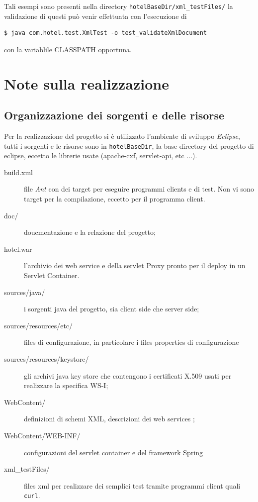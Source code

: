 \documentclass[a4paper]{article}
\begin{document}
Tali esempi sono presenti nella directory
\verb'hotelBaseDir/xml_testFiles/' la validazione di questi pu\`o venir
effettuata con l'esecuzione di
\begin{verbatim}
$ java com.hotel.test.XmlTest -o test_validateXmlDocument
\end{verbatim}
con la variablile CLASSPATH opportuna.


\section{Note sulla realizzazione}
\subsection{Organizzazione dei sorgenti e delle risorse}
\label{sec:realizzazione.organizzazione}
Per la realizzazione del progetto si \`e utilizzato l'ambiente di
sviluppo \emph{Eclipse}, tutti i sorgenti e le risorse sono in
\verb+hotelBaseDir+, la base directory del progetto di eclipse, eccetto
le librerie usate (apache-cxf, servlet-api, etc ...).
\begin{description}
\item [build.xml] file \emph{Ant} con dei target per eseguire
  programmi clients e di test. Non vi sono target per la compilazione,
  eccetto per il programma client.
\item [doc/] doucmentazione e la relazione del progetto;
\item [hotel.war] l'archivio dei web service e della servlet Proxy
  pronto per il deploy in un Servlet Container.
\item [sources/java/] i sorgenti java del progetto, sia client side che
  server side;
\item [sources/resources/etc/] files di configurazione, in particolare i
  files properties di configurazione 
\item [sources/resources/keystore/] gli archivi java key store che
  contengono i certificati X.509 usati per realizzare la specifica
  WS-I;
\item [WebContent/] definizioni di schemi XML, descrizioni dei web
  services ;
\item [WebContent/WEB-INF/] configurazioni del servlet container e del
  framework Spring
\item [xml\_testFiles/] files xml per realizzare dei semplici test
  tramite programmi client quali \verb+curl+.
\end{description}
\end{document}
